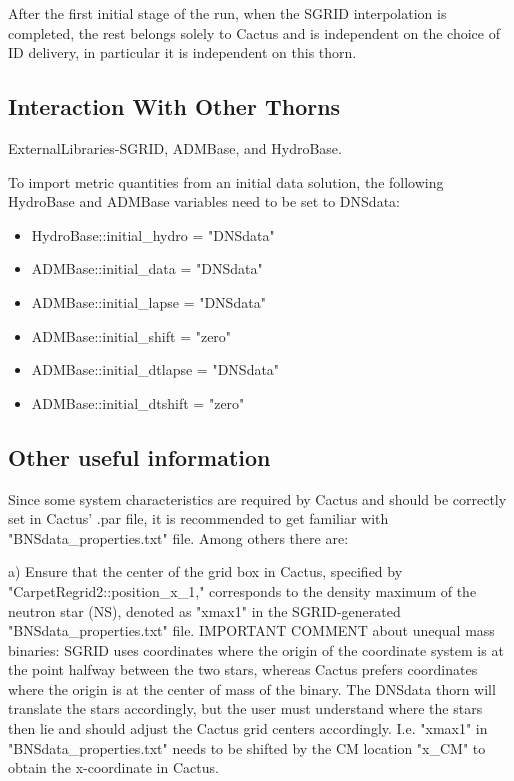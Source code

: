 After the first initial stage of the run, when the SGRID interpolation is
completed, the rest belongs solely to Cactus and is independent on the
choice of ID delivery, in particular it is independent on this thorn.


\subsection{Interaction With Other Thorns}

ExternalLibraries-SGRID, ADMBase, and HydroBase.

To import metric quantities from an initial data solution, the following HydroBase and ADMBase variables need to be set to DNSdata:
\begin{itemize}
\item HydroBase::initial\_hydro          = "DNSdata"
\item ADMBase::initial\_data             = "DNSdata"
\item ADMBase::initial\_lapse            = "DNSdata"
\item ADMBase::initial\_shift            = "zero"
\item ADMBase::initial\_dtlapse          = "DNSdata"
\item ADMBase::initial\_dtshift          = "zero"
\end{itemize}

\subsection{Other useful information}

Since some system characteristics are required by Cactus and should be
correctly set in Cactus' .par file, it is recommended to get familiar with
"BNSdata\_properties.txt" file. Among others there are:

a) Ensure that the center of the grid box in Cactus, specified by
"CarpetRegrid2::position\_x\_1," corresponds to the density maximum of the
neutron star (NS), denoted as "xmax1" in the SGRID-generated
"BNSdata\_properties.txt" file. IMPORTANT COMMENT about unequal mass
binaries: SGRID uses coordinates where the origin of the coordinate system
is at the point halfway between the two stars, whereas Cactus prefers
coordinates where the origin is at the center of mass of the binary. The
DNSdata thorn will translate the stars accordingly, but the user must
understand where the stars then lie and should adjust the Cactus grid
centers accordingly. I.e. "xmax1" in "BNSdata\_properties.txt" needs to be
shifted by the CM location "x\_CM" to obtain the x-coordinate in Cactus.

